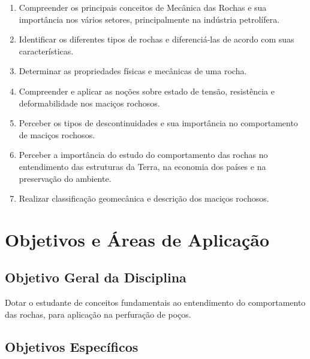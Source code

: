 \documentclass[12pt,a4paper,twoside]{book}
\begin{document}
\begin{enumerate}
    \item Compreender os principais conceitos de Mecânica das Rochas e sua importância nos vários 
    setores, principalmente na indústria petrolífera.
    \item Identificar os diferentes tipos de rochas e diferenciá-las de acordo com suas características.
    \item Determinar as propriedades físicas e mecânicas de uma rocha.
    \item Compreender e aplicar as noções sobre estado de tensão, resistência e deformabilidade 
    nos maciços rochosos.
    \item Perceber os tipos de descontinuidades e sua importância no comportamento de maciços rochosos.
    \item Perceber a importância do estudo do comportamento das rochas no entendimento das estruturas 
    da Terra, na economia dos países e na preservação do ambiente.
    \item Realizar classificação geomecânica e descrição dos maciços rochosos.
\end{enumerate}

\section{Objetivos e Áreas de Aplicação}

\subsection{Objetivo Geral da Disciplina}

Dotar o estudante de conceitos fundamentais ao entendimento do comportamento das rochas, para 
aplicação na perfuração de poços.

\subsection{Objetivos Específicos}
\end{document}
